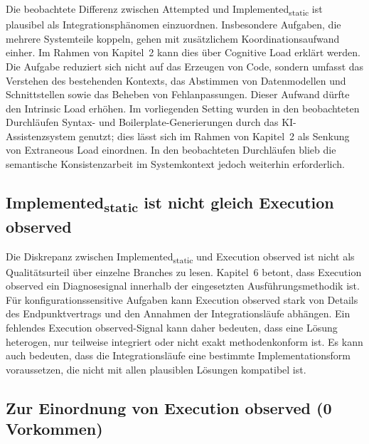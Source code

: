 Die beobachtete Differenz zwischen Attempted und Implemented\textsubscript{static} ist plausibel als Integrationsph\"anomen einzuordnen.
Insbesondere Aufgaben, die mehrere Systemteile koppeln, gehen mit zus\"atzlichem Koordinationsaufwand einher.
Im Rahmen von Kapitel~2 kann dies \"uber Cognitive Load erkl\"art werden.
Die Aufgabe reduziert sich nicht auf das Erzeugen von Code, sondern umfasst das Verstehen des bestehenden Kontexts, das Abstimmen von Datenmodellen und Schnittstellen sowie das Beheben von Fehlanpassungen.
Dieser Aufwand d\"urfte den Intrinsic Load erh\"ohen.
Im vorliegenden Setting wurden in den beobachteten Durchl\"aufen Syntax- und Boilerplate-Generierungen durch das KI-Assistenzsystem genutzt; dies l\"asst sich im Rahmen von Kapitel~2 als Senkung von Extraneous Load einordnen.
In den beobachteten Durchl\"aufen blieb die semantische Konsistenzarbeit im Systemkontext jedoch weiterhin erforderlich.

\subsection{\texorpdfstring{Implemented\textsubscript{static}}{Implementedstatic} ist nicht gleich Execution observed}
\label{sec:discussion_implemented_vs_execution_observed}

Die Diskrepanz zwischen Implemented\textsubscript{static} und Execution observed ist nicht als Qualit\"atsurteil \"uber einzelne Branches zu lesen.
Kapitel~6 betont, dass Execution observed ein Diagnosesignal innerhalb der eingesetzten Ausf\"uhrungsmethodik ist.
F\"ur konfigurationssensitive Aufgaben kann Execution observed stark von Details des Endpunktvertrags und den Annahmen der Integrationsl\"aufe abh\"angen.
Ein fehlendes Execution observed-Signal kann daher bedeuten, dass eine L\"osung heterogen, nur teilweise integriert oder nicht exakt methodenkonform ist.
Es kann auch bedeuten, dass die Integrationsl\"aufe eine bestimmte Implementationsform voraussetzen, die nicht mit allen plausiblen L\"osungen kompatibel ist.

\subsection{Zur Einordnung von Execution observed (0 Vorkommen)}
\label{sec:discussion_execution_observed_zero}

